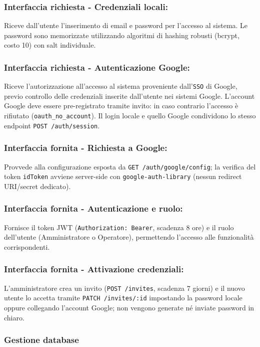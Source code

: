         \subsubsection*{Interfaccia richiesta - Credenziali locali:}
            Riceve dall'utente l'inserimento di email e password per l'accesso al sistema. Le password sono memorizzate utilizzando algoritmi di hashing robusti (bcrypt, costo 10) con salt individuale.
        \subsubsection*{Interfaccia richiesta - Autenticazione Google:}
            Riceve l'autorizzazione all'accesso al sistema proveniente dall'\texttt{SSO} di Google, previo controllo delle credenziali inserite dall'utente nei sistemi Google. L'account Google deve essere pre-registrato tramite invito: in caso contrario l'accesso \`e rifiutato (\texttt{oauth\_no\_account}). Il login locale e quello Google condividono lo stesso endpoint \texttt{POST /auth/session}.
        \subsubsection*{Interfaccia fornita - Richiesta a Google:}
            Provvede alla configurazione esposta da \texttt{GET /auth/google/config}; la verifica del token \texttt{idToken} avviene server-side con \texttt{google-auth-library} (nessun redirect URI/secret dedicato).
        \subsubsection*{Interfaccia fornita - Autenticazione e ruolo:}
            Fornisce il token JWT (\texttt{Authorization: Bearer}, scadenza 8 ore) e il ruolo dell'utente (Amministratore o Operatore), permettendo l'accesso alle funzionalità corrispondenti.
        \subsubsection*{Interfaccia fornita - Attivazione credenziali:}
            L'amministratore crea un invito (\texttt{POST /invites}, scadenza 7 giorni) e il nuovo utente lo accetta tramite \texttt{PATCH /invites/:id} impostando la password locale oppure collegando l'account Google; non vengono generate n\'e inviate password in chiaro.

    \subsubsection{Gestione database}
